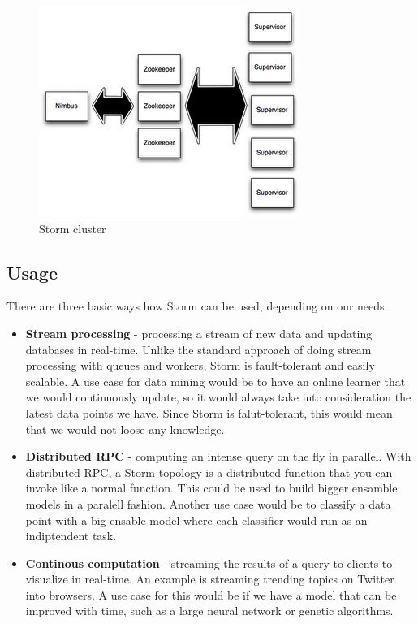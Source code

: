\documentclass[journal]{IEEEtran/IEEEtran}
\begin{document}
\begin{figure}[htbp]
    \begin{center}
        \includegraphics[scale=0.70]{img/storm-cluster.png}
        \caption{Storm cluster}
        \label{stormcluster}
    \end{center}
\end{figure}


\subsection{Usage}

There are three basic ways how Storm can be used, depending on our needs. \\

\begin{itemize}
    \item \textbf{Stream processing} - processing a stream of new data and updating databases in real-time. Unlike the standard approach of doing stream processing with queues and workers, Storm is fault-tolerant and easily scalable. A use case for data mining would be to have an online learner that we would continuously update, so it would always take into consideration the latest data points we have. Since Storm is falut-tolerant, this would mean that we would not loose any knowledge.\\
    \item \textbf{Distributed RPC} - computing an intense query on the fly in parallel. With distributed RPC, a Storm topology is a distributed function that you can invoke like a normal function. This could be used to build bigger ensamble models in a paralell fashion. Another use case would be to classify a data point with a big ensable model where each classifier would run as an indiptendent task.\\
    \item \textbf{Continous computation} - streaming the results of a query to clients to visualize in real-time. An example is streaming trending topics on Twitter into browsers. A use case for this would be if we have a model that can be improved with time, such as a large neural network or genetic algorithms.\\
\end{itemize}
\end{document}
